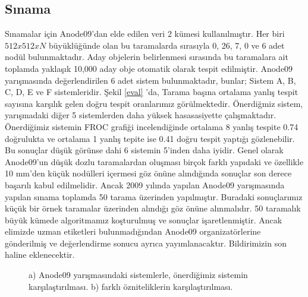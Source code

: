 \documentclass[conference]{IEEEtran}
\begin{document}
\subsection{Sınama}
Sınamalar için Anode09'dan elde edilen veri 2 kümesi kullanılmıştır. Her biri $512x512xN$ büyüklüğünde olan bu taramalarda sırasıyla 0, 26, 7, 0 ve 6 adet nodül bulunmaktadır. Aday objelerin belirlenmesi sırasında bu taramalara ait toplamda yaklaşık 10,000 aday obje otomatik olarak tespit edilmiştir.
Anode09 yarışmasında değerlendirilen 6 adet sistem bulunmaktadır, bunlar; Sistem A, B, C, D, E ve F sistemleridir. Şekil \ref{eval} 'da, Tarama başına ortalama yanlış tespit sayısına karşılık gelen doğru tespit oranlarımız görülmektedir. Önerdiğmiz sistem, yarışmadaki diğer 5 sistemlerden daha yüksek hasasasiyette çalışmaktadır. Önerdiğimiz sistemin FROC grafiği incelendiğinde ortalama 8 yanlış tespite 0.74 doğrulukta ve ortalama 1 yanlış tepite ise 0.41 doğru tespit yaptığı gözlenebilir. Bu sonuçlar düşük görünse dahi 6 sistemin 5'inden daha iyidir. Genel olarak Anode09'un düşük dozlu taramalardan oluşması birçok farklı yapıdaki ve özellikle 10 mm'den küçük nodülleri içermesi göz önüne alındığında sonuçlar son derece başarılı kabul edilmelidir. Ancak 2009 yılında yapılan Anode09 yarışmasında yapılan sınama toplamda 50 tarama üzerinden yapılmıştır. Buradaki sonuçlarımız küçük bir örnek taramalar üzerinden alındığı göz önüne alınmalıdır. 50 taramalık büyük kümede algoritmamız koşturulmuş ve sonuçlar işaretlenmiştir. Ancak elimizde uzman etiketleri bulunmadığından Anode09 organizatörlerine gönderilmiş ve değerlendirme sonucu ayrıca yayımlanacaktır. Bildirimizin son haline eklenecektir.

\begin{figure}[tb]
\centering
{}
\caption{a) Anode09 yarışmasındaki sistemlerle, önerdiğimiz sistemin karşılaştırılması. b) farklı özniteliklerin karşılaştırılması.}
\end{figure}
\end{document}
